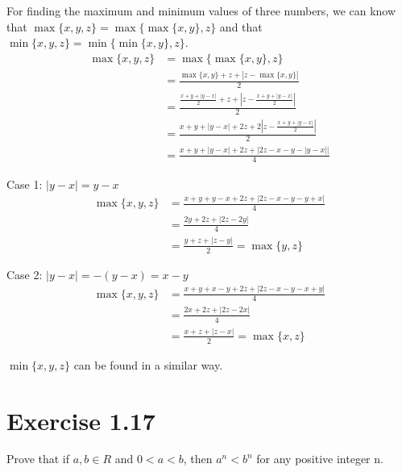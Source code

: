 \documentclass[12pt]{report}
\begin{document}
For finding the maximum and minimum values of three numbers, we can know that $\max\{x,y,z\} = \max\{\max\{x,y\},z\}$ and that $\min\{x,y,z\} = \min\{\min\{x,y\},z\}$.
\begin{align}
    \max\{x,y,z\}   &=  \max\{\max\{x,y\},z\}\\
        &=  \frac{\max\{x,y\} + z + \left| z - \max\{x,y\} \right|}{2}\\
        &=  \frac{\frac{x + y + |y - x|}{2} + z + \left| z - \frac{x + y + |y - x|}{2} \right|}{2}\\
        &=  \frac{x + y + |y - x| + 2z + 2\left| z - \frac{x + y + |y - x|}{2} \right|}{2}\\
        &=  \boxed{\frac{x + y + |y - x| + 2z + \left| 2z - x - y - |y - x| \right|}{4}}
\end{align}

\pagebreak
Case 1: $|y - x| = y - x$
\begin{align}
    \max\{x,y,z\}   &=  \frac{x + y + y - x + 2z + \left| 2z - x - y - y + x \right|}{4}\\
        &=  \frac{2y + 2z + \left| 2z - 2y \right|}{4}\\
        &=  \frac{y + z + \left| z - y \right|}{2}
        =   \max\{y,z\}
\end{align}

Case 2: $|y - x| = -(y - x) = x - y$
\begin{align}
    \max\{x,y,z\}   &=  \frac{x + y + x - y + 2z + \left| 2z - x - y - x + y \right|}{4}\\
        &=  \frac{2x + 2z + \left| 2z - 2x \right|}{4}\\
        &=  \frac{x + z + \left| z - x \right|}{2}
        =   \max\{x,z\}
\end{align}

$\min\{x,y,z\}$ can be found in a similar way.

\pagebreak
\section{Exercise 1.17}
Prove that if $a, b \in R$ and $0 < a < b$, then  $a^n < b^n$ for any positive integer n. 
\end{document}
